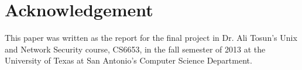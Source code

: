 \section*{Acknowledgement}
This paper was written as the report for the final project in Dr. Ali Tosun's Unix and Network Security course, CS6653, in the fall semester of 2013 at the University of Texas at San Antonio's Computer Science Department.
